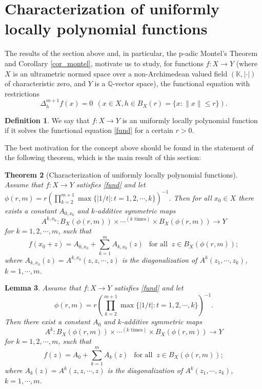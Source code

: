 \documentclass[12pt,a4paper]{amsart}
\newtheorem{theorem}{Theorem}[section]
\newtheorem{lemma}[theorem]{Lemma}
\theoremstyle{definition}
\newtheorem{definition}[theorem]{Definition}
\begin{document}
\section{Characterization of uniformly locally polynomial functions}

The results of the section above and, in particular, the p-adic Montel's Theorem and Corollary \ref{cor_montel}, motivate us to study, for functions $f:X\to Y$ (where
 $X$ is an ultrametric normed  space over a non-Archimedean valued field $(\mathbb{K},|\cdot|)$ of characteristic zero, and $Y$ is a $\mathbb{Q}$-vector space), the functional equation with restrictions
\begin{equation} \label{fund}
\Delta_h^{m+1}f(x)=0 \ \ (x\in X, h\in B_X(r)=\{x:\|x\|\leq r\}).
\end{equation}  

\begin{definition} We say that $f:X\to Y$ is an uniformly locally polynomial function if it solves the functional equation \eqref{fund} for a certain $r>0$. 
\end{definition}
The best motivation for the concept above should be found in the statement of the following theorem, which is the main result of this section:
\begin{theorem}[Characterization of uniformly locally polynomial functions] \label{CL} Assume that $f:X\to Y$ satisfies \eqref{fund}
and let $\phi(r,m)=r\left(\prod_{k=2}^{m+1} \max\{|1/t|:t=1,2,\cdots,k\}\right)^{-1}$. Then for all $x_0\in X$ there exists a constant $A_{0,x_0}$ and  $k$-additive symmetric  maps 
$$A^{k,x_0}:B_X(\phi(r,m))\times\cdots ^{(k\text{ times})}\times B_X(\phi(r,m))\to Y$$ for $k=1,2,\cdots,m$, such that 
\[
f(x_0+z)=A_{0,x_0}+\sum_{k=1}^mA_{k,x_0}(z) \  \ \text{ for all } \ z\in B_X(\phi(r,m));
\]  
where $A_{k,x_0}(z)=A^{k,x_0}(z,z,\cdots,z)$ is the diagonalization of $A^{k}(z_1,\cdots,z_k)$, $k=1,\cdots,m$. 
\end{theorem}

\begin{lemma} \label{L} Assume that $f:X\to Y$ satisfies \eqref{fund}
and let $$\phi(r,m)=r\left(\prod_{k=2}^{m+1} \max\{|1/t|:t=1,2,\cdots,k\}\right)^{-1}.$$ Then there exist a constant $A_0$ and  $k$-additive symmetric  maps $$A^{k}:B_X(\phi(r,m))\times\cdots ^{(k\text{ times})}\times B_X(\phi(r,m))\to Y$$ for $k=1,2,\cdots,m$, such that 
\[
f(z)=A_0+\sum_{k=1}^mA_{k}(z) \  \ \text{ for all } \ z\in B_X(\phi(r,m));
\]  
where $A_{k}(z)=A^{k}(z,z,\cdots,z)$ is the diagonalization of $A^{k}(z_1,\cdots,z_k)$, $k=1,\cdots,m$. 
\end{lemma} 
\end{document}
